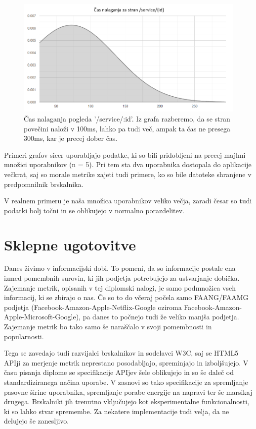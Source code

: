 \documentclass[a4paper, 12pt]{book}
\begin{document}
\begin{figure}[h]
	\begin{center}
		\includegraphics[width=1\textwidth]{page_load_graph_service_details.png}
	\end{center}
	\caption{Čas nalaganja pogleda '/service/:id'. Iz grafa razberemo, da se stran povečini naloži v 100ms, lahko pa tudi več, ampak ta čas ne presega 300ms, kar je precej dober čas.}
	\label{img:graph_page_load}
\end{figure}

Primeri grafov sicer uporabljajo podatke, ki so bili pridobljeni na precej majhni množici uporabnikov (n = 5). Pri tem sta dva uporabnika dostopala do aplikacije večkrat, saj so morale metrike zajeti tudi primere, ko so bile datoteke shranjene v predpomnilnik brskalnika.

V realnem primeru je naša množica uporabnikov veliko večja, zaradi česar so tudi podatki bolj točni in se oblikujejo v normalno porazdelitev.

\chapter{Sklepne ugotovitve}
\label{ch4}

Danes živimo v informacijski dobi. To pomeni, da so informacije postale ena izmed pomembnih surovin, ki jih podjetja potrebujejo za ustvarjanje dobička. Zajemanje metrik, opisanih v tej diplomski nalogi, je samo podmnožica vseh informacij, ki se zbirajo o nas. Če so to do včeraj počela samo FAANG/FAAMG podjetja (Facebook-Amazon-Apple-Netflix-Google oziroma Facebook-Amazon-Apple-Microsoft-Google), pa danes to počnejo tudi že veliko manjša podjetja. Zajemanje metrik bo tako samo še naraščalo v svoji pomembnosti in popularnosti.

Tega se zavedajo tudi razvijalci brskalnikov in sodelavci W3C, saj se HTML5 APIji za merjenje metrik neprestano posodabljajo, spreminjajo in izboljšujejo. V času pisanja diplome se specifikacije APIjev šele oblikujejo in so še daleč od standardiziranega načina uporabe. V zasnovi so tako specifikacije za spremljanje pasovne širine uporabnika, spremljanje porabe energije na napravi ter še marsikaj drugega. Brskalniki jih trenutno vključujejo kot eksperimentalne funkcionalnosti, ki so lahko stvar spremembe. Za nekatere implementacije tudi velja, da ne delujejo še zanesljivo.
\end{document}
